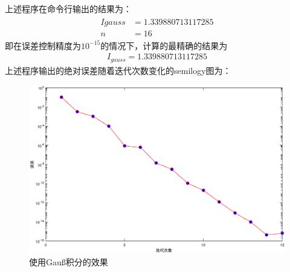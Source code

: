 \documentclass[12pt,a4paper,utf8]{ctexart}
\begin{document}
\begin{enumerate}
         上述程序在命令行输出的结果为：
         \begin{eqnarray}
            \begin{aligned}
               Igauss & =1.339880713117285 \\
               n      & =16
               \nonumber
            \end{aligned}
         \end{eqnarray}
         即在误差控制精度为$10^{-15}$的情况下，计算的最精确的结果为
         \begin{eqnarray}
            I_{gauss}=1.339880713117285
            \nonumber
         \end{eqnarray}
         上述程序输出的绝对误差随着迭代次数变化的semilogy图为：
         \begin{figure}[H]
            \centering
            \includegraphics[width=1\textwidth]{fig/p1c.eps}
            \caption{使用Gauß积分的效果}
         \end{figure}


\end{enumerate}
\end{document}
